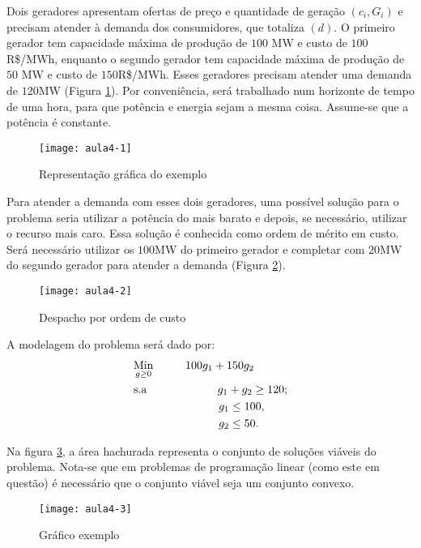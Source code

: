 \begin{exemplo}
Dois geradores apresentam ofertas de preço e quantidade de geração $(c_{i},G_{i})$ e precisam atender à demanda dos consumidores, que
totaliza $(d)$. O primeiro gerador tem capacidade máxima de produção de $100$ MW e custo de $100$R\$/MWh, enquanto o segundo gerador tem
capacidade máxima de produção de $50$ MW e custo de $150$R\$/MWh. Esses geradores precisam atender uma demanda de $120$MW (Figura \ref{fig:aula4-1}). Por conveniência, será trabalhado num horizonte de tempo de uma hora, para que potência
e energia sejam a mesma coisa. Assume-se que a potência é constante.
\begin{figure}[H]
\begin{centering}
\texttt{[image: aula4-1]}\protect\caption{\label{fig:aula4-1} Representação gráfica do exemplo }
\end{centering}
\end{figure}
Para atender a demanda com esses dois geradores, uma possível solução para o problema seria utilizar a potência do mais barato e depois, se necessário, utilizar o recurso mais caro. Essa solução é conhecida como ordem de mérito em custo. Será necessário utilizar os $100$MW
do primeiro gerador e completar com $20$MW do segundo gerador para atender a demanda (Figura \ref{fig:aula4-2}).
\begin{figure}[H]
\begin{centering}
\texttt{[image: aula4-2]}\protect\caption{\label{fig:aula4-2} Despacho por ordem de custo }
\end{centering}
\end{figure}
A modelagem do problema será dado por:
\begin{align}
    & \underset{g\geq0}{\text{Min}} \hspace{1cm} 100g_1+150g_2 \label{eq1} \\
    & \text{s.a}  \hspace{2.2cm} g_1+g_2 \geq 120; \label{eq2} \\
    &             \hspace{2.65cm} g_1\leq 100, \label{eq3}\\
    &             \hspace{2.65cm} g_2\leq 50. \label{eq4}
\end{align}

Na figura \ref{fig:aula4-3}, a área hachurada representa o conjunto de soluções viáveis do problema. Nota-se que em problemas de programação linear (como este em questão) é necessário que o conjunto viável seja um conjunto convexo.
\begin{figure}[H]
\begin{centering}
\texttt{[image: aula4-3]}\protect\caption{\label{fig:aula4-3} Gráfico exemplo }
\end{centering}
\end{figure}
\end{exemplo}



